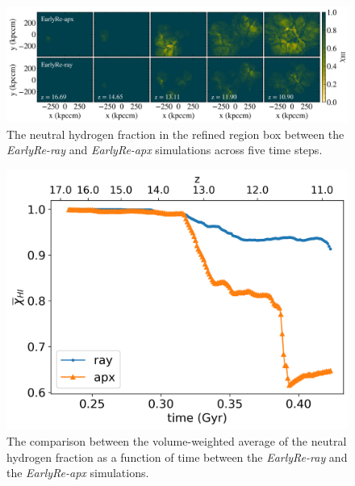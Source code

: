 \documentclass[linenumbers, twocolumn]{aastex631}
\begin{document}
\begin{figure}
    \centering
    \includegraphics[width=\textwidth]{EarlyRe/neutralHfraction_comparison_multiple.png}
    \caption{The neutral hydrogen fraction in the refined region box between the \textit{EarlyRe-ray} and \textit{EarlyRe-apx} simulations across five time steps.}
    \label{fig:neutralHfrac_map}
\end{figure}

\begin{figure}
    \centering
    \includegraphics[width=0.95\columnwidth]{EarlyRe/neutralHfraction_evolution.png}
    \caption{The comparison between the volume-weighted average of the neutral hydrogen fraction as a function of time between the \textit{EarlyRe-ray} and the \textit{EarlyRe-apx} simulations.}
    \label{fig:neutralHfrac_evolution}
\end{figure}
\end{document}
